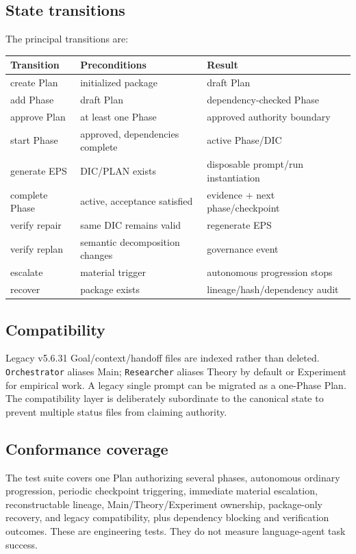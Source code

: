 \documentclass[11pt,a4paper]{article}
\begin{document}
\subsection{State transitions}
The principal transitions are:
\begin{center}
\small
\begin{tabular}{lll}
\toprule
Transition & Preconditions & Result\\
\midrule
create Plan & initialized package & draft Plan\\
add Phase & draft Plan & dependency-checked Phase\\
approve Plan & at least one Phase & approved authority boundary\\
start Phase & approved, dependencies complete & active Phase/DIC\\
generate EPS & DIC/PLAN exists & disposable prompt/run instantiation\\
complete Phase & active, acceptance satisfied & evidence + next phase/checkpoint\\
verify repair & same DIC remains valid & regenerate EPS\\
verify replan & semantic decomposition changes & governance event\\
escalate & material trigger & autonomous progression stops\\
recover & package exists & lineage/hash/dependency audit\\
\bottomrule
\end{tabular}
\end{center}

\subsection{Compatibility}
Legacy v5.6.31 Goal/context/handoff files are indexed rather than deleted. \texttt{Orchestrator} aliases Main; \texttt{Researcher} aliases Theory by default or Experiment for empirical work. A legacy single prompt can be migrated as a one-Phase Plan. The compatibility layer is deliberately subordinate to the canonical state to prevent multiple status files from claiming authority.

\subsection{Conformance coverage}
The test suite covers one Plan authorizing several phases, autonomous ordinary progression, periodic checkpoint triggering, immediate material escalation, reconstructable lineage, Main/Theory/Experiment ownership, package-only recovery, and legacy compatibility, plus dependency blocking and verification outcomes. These are engineering tests. They do not measure language-agent task success.
\end{document}
